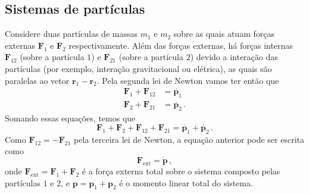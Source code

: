 \documentclass[twocolumn=on,DIV=calc]{scrartcl}
\begin{document}
\subsection{Sistemas de partículas}
Considere duas partículas de massas $m_1$ e $m_2$ sobre as quais atuam
forças externas $\mathbf{F}_1$ e $\mathbf{F}_2$ respectivamente. Além
das forças externas, há forças internas $\mathbf{F}_{12}$ (sobre a
partícula $1$) e $\mathbf{F}_{21}$ (sobre a partícula $2$) devido a
interação das partículas (por exemplo, interação gravitacional ou
elétrica), as quais são paralelas ao vetor
$\mathbf{r}_1-\mathbf{r}_2$. Pela segunda lei de Newton vamos ter
então que
\begin{equation}
  \label{eq:5}
  \begin{split}
    \mathbf{F}_1+\mathbf{F}_{12}&=\dot{\mathbf{p}_1}\\
    \mathbf{F}_2+\mathbf{F}_{21}&=\dot{\mathbf{p}_2}\,.
  \end{split}
\end{equation}
Somando essas equações, temos que
$$\mathbf{F}_1+\mathbf{F}_2+\mathbf{F}_{12}+\mathbf{F}_{21}=\dot{\mathbf{p}_1}+\dot{\mathbf{p}_2}\,.$$
Como $\mathbf{F}_{12}=-\mathbf{F}_{21}$ pela terceira lei de Newton, a
equação anterior pode ser escrita como
\begin{equation}
  \label{eq:6}
  \mathbf{F}_{\mathrm{ext}}=\dot{\mathbf{p}}\,,
\end{equation}
onde $\mathbf{F}_{\mathrm{ext}}=\mathbf{F}_1+\mathbf{F}_2$ é a força
externa total sobre o sistema composto pelas partículas $1$ e $2$, e
$\mathbf{p}=\mathbf{p}_1+\mathbf{p}_2$ é o momento linear total do
sistema.
\end{document}
